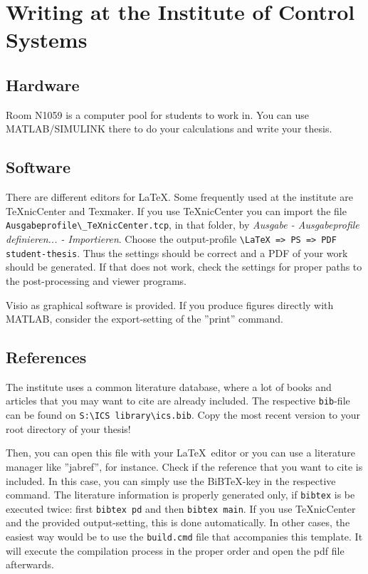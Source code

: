 \section{Writing at the Institute of Control Systems}	\label{a:ab_rts_en}


\subsection{Hardware}

Room N1059 is a computer pool for students to work in. You can use MATLAB/SIMULINK 
there to do your calculations and write your thesis.


\subsection{Software}

There are different editors for \LaTeX. Some frequently used at the institute are TeXnicCenter and Texmaker. 
If you use TeXnicCenter you can import the file \linebreak \verb"Ausgabeprofile\_TeXnicCenter.tcp", in that folder, by 
\textit{Ausgabe - Ausgabeprofile definieren... - Importieren}. Choose the output-profile \verb!\LaTeX => PS => PDF student-thesis!. 
Thus the settings should be correct and a PDF of your work should be generated. If that does not work, check the settings for proper
paths to the post-processing and viewer programs.

Visio as graphical software is provided. If you produce figures directly with MATLAB, consider the export-setting of the ''print'' command.

\subsection{References}

The institute uses a common literature database, where a lot of books and articles that you may want to cite are already included. 
The respective \texttt{bib}-file can be found on \verb"S:\ICS library\ics.bib".
Copy the most recent version to your root directory of your thesis!

Then, you can open this file with your \LaTeX\ editor or you can use a literature manager like ''jabref'', for instance.
Check if the reference that you want to cite is included. In this case, you can simply use the BiB\TeX-key in the respective command.
The literature information is properly generated only, if \texttt{bibtex} is be executed twice: first \verb!bibtex pd! and then \verb!bibtex main!. 
If you use TeXnicCenter and the provided output-setting, this is done automatically. In other cases, the easiest way would be to use
the \texttt{build.cmd} file that accompanies this template. It will execute the compilation process in the proper order and open the pdf file
afterwards.

